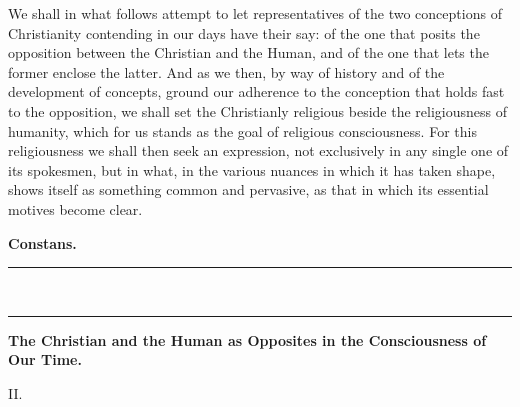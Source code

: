 \documentclass[12pt,a4paper,openany]{book}
\newcommand{\secnum}[1]{\par\begin{center}#1\end{center}\par\nobreak}
\newcommand{\opage}[1]{\marginnote{\footnotesize\textit{[#1]}}}
\begin{document}
We shall in what follows attempt to let representatives
of the two conceptions of Christianity contending in our days
have their say: of the one that posits the opposition
between the Christian and the Human, and of the one
that lets the former enclose the latter. And as we then, by way of
history and of the development of concepts, ground our adherence
to the conception that holds fast to the opposition,
we shall set the Christianly religious beside the religiousness
of humanity, which for us stands as the goal of religious consciousness.
For this religiousness we shall then seek an expression, not
exclusively in any single one of its spokesmen, but in
what, in the various nuances in which it has taken
shape, shows itself as something common and pervasive, as
that in which its essential motives become clear.

\begin{flushright}\textbf{Constans.}\end{flushright}
\begin{center}\rule{2.6cm}{0.4pt}\\[-10pt]\rule{2.6cm}{0.4pt}\end{center}

\clearpage
\opage{433}\begin{center}\textbf{\large The Christian and the Human as Opposites in the Consciousness of Our Time.}\end{center}

\secnum{II.}
\end{document}
